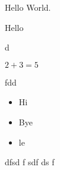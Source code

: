 \documentclass{article}
\begin{document}
Hello World.
\begin{comment}
 This is a comment too.
\end{comment}
Hello

\begin{comment}
 And so is this one
...

\end{comment}
d

  $2+3=5$

fdd

\begin{itemize}
\item  Hi
\item  Bye
\item  le

\end{itemize}
dfsd
f
sdf
ds
f
\end{document}

